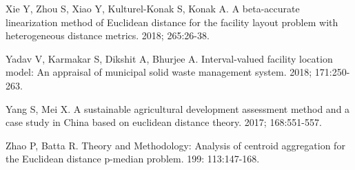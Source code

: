 \documentclass[twoside,twocolumn]{article}
\begin{document}
\begin{thebibliography}{99}
Xie Y, Zhou S, Xiao Y, Kulturel-Konak S, Konak A.
\newblock A beta-accurate linearization method of Euclidean distance for the facility layout problem with heterogeneous distance metrics.
 2018; 265:26-38.

Yadav V, Karmakar S, Dikshit A, Bhurjee A.
\newblock Interval-valued facility location model: An appraisal of municipal solid waste management system.
 2018; 171:250-263.

Yang S, Mei X.
\newblock A sustainable agricultural development assessment method and a case study in China based on euclidean distance theory.
 2017; 168:551-557.

Zhao P, Batta R.
\newblock Theory and Methodology: Analysis of centroid aggregation for the Euclidean distance p-median problem.
 199: 113:147-168.

\end{thebibliography}
\end{document}
